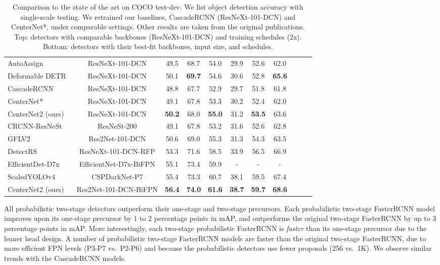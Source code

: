 \documentclass{article}
\newcommand{\name}{CenterNet2 }
\begin{document}
\begin{table*}[t]
\begin{tabular}{@{}l@{\ \ \ \ }c@{\ \ \ \ }c@{\ \ \ \ }c@{\ \ \ \ }c@{\ \ \ \ }c@{\ \ \ \ }c@{\ \ \ \ }c@{\ \ \ \ }c@{\ \ \ \ }c@{\ \ \ \ }c@{}}
        AutoAssign~\cite{zhu2020autoassign} & ResNeXt-101-DCN & 49.5 & 68.7 & 54.0 & 29.9 & 52.6 & 62.0 \\
        Deformable DETR~\cite{zhu2020deformable} & ResNeXt-101-DCN & 50.1 & \textbf{69.7} & 54.6 & 30.6 & 52.8 & \textbf{65.6} \\
        CascadeRCNN~\cite{cai2018cascade} & ResNeXt-101-DCN & 48.8 & 67.7 & 52.9 & 29.7 & 51.8 & 61.8 \\
        CenterNet* & ResNeXt-101-DCN & 49.1 & 67.8 & 53.3 & 30.2 & 52.4 & 62.0\\
        \name (ours) & ResNeXt-101-DCN & \textbf{50.2} & 68.0 & \textbf{55.0} & 31.2 & \textbf{53.5} & 63.6\\
        \midrule
        CRCNN-ResNeSt~\cite{zhang2020resnest} & ResNeSt-200 & 49.1 & 67.8 & 53.2 & 31.6 & 52.6 & 62.8 \\
        GFLV2~\cite{li2020generalizedv2} & Res2Net-101-DCN & 50.6 & 69.0 & 55.3 & 31.3 & 54.3 & 63.5 \\
        DetectRS~\cite{qiao2020detectors} & ResNeXt-101-DCN-RFP & 53.3 & 71.6 & 58.5 & 33.9 & 56.5 & 66.9 \\
        EfficientDet-D7x~\cite{tan2020efficientdet} & EfficientNet-D7x-BiFPN & 55.1 & {73.4} & 59.9 & - & - & - \\
        ScaledYOLOv4~\cite{wang2020scaled} & CSPDarkNet-P7 & 55.4 & { 73.3} & 60.7 & {38.1} & {59.5} & 67.4 \\
        CenterNet2 (ours) & Res2Net-101-DCN-BiFPN & {\bf 56.4} & {\bf 74.0} & {\bf 61.6} & {\bf 38.7} & {\bf 59.7} & {\bf 68.6} \\
\bottomrule
\end{tabular}
\normalsize
\vspace{-2mm}
\caption{Comparison to the state of the art on COCO test-dev. We list object detection accuracy with single-scale testing. We retrained our baselines, CascadeRCNN (ResNeXt-101-DCN) and CenterNet*, under comparable settings. Other results are taken from the original publications. Top: detectors with comparable backbones (ResNeXt-101-DCN) and training schedules (2x). Bottom: detectors with their best-fit backbones, input size, and schedules.}
\label{table:sota}
\vspace{-5mm}
\end{table*}

All probabilistic two-stage detectors outperform their one-stage and two-stage precursors.
Each probabilistic two-stage FasterRCNN model improves upon its one-stage precursor by 1 to 2 percentage points in mAP, and outperforms the original two-stage FasterRCNN by up to 3 percentage points in mAP.
More interestingly, each two-stage probabilistic FasterRCNN is \emph{faster} than its one-stage precursor due to the leaner head design.
A number of probabilistic two-stage FasterRCNN models are faster than the original two-stage FasterRCNN, due to more efficient FPN levels (P3-P7 vs.\ P2-P6) and because the probabilistic detectors 
use
fewer proposals (256 vs.\ 1K).
We observe similar trends with the CascadeRCNN models.
\end{document}
